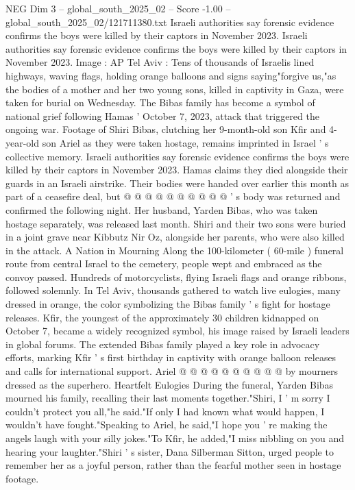 \begin{textsample}{NEG Dim 3 – global\_south\_2025\_02 – Score -1.00 – global\_south\_2025\_02/121711380.txt}  \label{ex:f3_neg_007}
Israeli authorities say forensic evidence confirms the boys were killed by their captors in November 2023.
Israeli authorities say forensic evidence confirms the boys were killed by their captors in November 2023.
Image : AP Tel Aviv : Tens of thousands of Israelis lined highways, waving flags, holding orange balloons and signs saying"forgive us,"as the bodies of a mother and her two young sons, killed in captivity in Gaza, were taken for burial on Wednesday.
The Bibas family has become a symbol of national grief following Hamas ' October 7, 2023, attack that triggered the ongoing war.
Footage of Shiri Bibas, clutching her 9-month-old son Kfir and 4-year-old son Ariel as they were taken hostage, remains imprinted in Israel ' s collective memory.
Israeli authorities say forensic evidence confirms the boys were killed by their captors in November 2023.
Hamas claims they died alongside their guards in an Israeli airstrike.
Their bodies were handed over earlier this month as part of a ceasefire deal, but @ @ @ @ @ @ @ @ @ @ ' s body was returned and confirmed the following night.
Her husband, Yarden Bibas, who was taken hostage separately, was released last month.
Shiri and their two sons were buried in a joint grave near Kibbutz Nir Oz, alongside her parents, who were also killed in the attack.
A Nation in Mourning Along the 100-kilometer ( 60-mile ) funeral route from central Israel to the cemetery, people wept and embraced as the convoy passed.
Hundreds of motorcyclists, flying Israeli flags and orange ribbons, followed solemnly.
In Tel Aviv, thousands gathered to watch live eulogies, many dressed in orange, the color symbolizing the Bibas family ' s fight for hostage releases.
Kfir, the youngest of the approximately 30 children kidnapped on October 7, became a widely recognized symbol, his image raised by Israeli leaders in global forums.
The extended Bibas family played a key role in advocacy efforts, marking Kfir ' s first birthday in captivity with orange balloon releases and calls for international support.
Ariel @ @ @ @ @ @ @ @ @ @ by mourners dressed as the superhero.
Heartfelt Eulogies During the funeral, Yarden Bibas mourned his family, recalling their last moments together."Shiri, I ' m sorry I couldn't protect you all,"he said."If only I had known what would happen, I wouldn't have fought."Speaking to Ariel, he said,"I hope you ' re making the angels laugh with your silly jokes."To Kfir, he added,"I miss nibbling on you and hearing your laughter."Shiri ' s sister, Dana Silberman Sitton, urged people to remember her as a joyful person, rather than the fearful mother seen in hostage footage.

\end{textsample}

